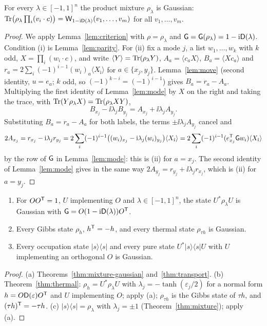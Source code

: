 \begin{theorem}\label{thm:mixture-gaussian}
For every $\lambda\in[-1,1]^n$ the product mixture $\rho_\lambda$ is Gaussian:
$\operatorname{Tr}\bigl(\rho_\lambda\prod_i(v_i\cdot c)\bigr)=\mathsf W_{1-\mathrm i\mathsf D(\lambda)}(v_1,\ldots,v_m)$ for all
$v_1,\ldots,v_m$.
\end{theorem}
\begin{proof}
We apply Lemma~\ref{lem:criterion} with $\rho=\rho_\lambda$ and $\mathsf G=\mathsf G(\rho_\lambda)=1-\mathrm i\mathsf D(\lambda)$.
Condition (i) is Lemma~\ref{lem:parity}. For (ii) fix a mode $j$, a list $w_1,\ldots,w_k$ with
$k$ odd, $X=\prod_i(w_i\cdot c)$, and write $\langle Y\rangle=\operatorname{Tr}(\rho_\lambda Y)$,
$A_a=\langle c_aX\rangle$, $B_a=\langle Xc_a\rangle$ and
$r_a=2\sum_i(-1)^{i-1}(w_i)_a\langle X_{\hat\imath}\rangle$ for $a\in\{x_j,y_j\}$.
Lemma~\ref{lem:move} (second identity, $u=e_a$; $k$ odd, so $(-1)^{k-i}=(-1)^{i-1}$) gives
$B_a=r_a-A_a$. Multiplying the first identity of Lemma~\ref{lem:mode} by $X$ on the right and
taking the trace, with $\operatorname{Tr}(Y\rho_\lambda X)=\operatorname{Tr}(\rho_\lambda XY)$,
\[
 B_{x_j}-\ii\lambda_jB_{y_j}=A_{x_j}+\ii\lambda_jA_{y_j}.
\]
Substituting $B_a=r_a-A_a$ for both labels, the terms $\pm\ii\lambda_jA_{y_j}$ cancel and
\[
 2A_{x_j}=r_{x_j}-\mathrm i\lambda_jr_{y_j}
 =2\sum_i(-1)^{i-1}\bigl((w_i)_{x_j}-\mathrm i\lambda_j(w_i)_{y_j}\bigr)\langle X_{\hat\imath}\rangle
 =2\sum_i(-1)^{i-1}(e_{x_j}^{\mathsf T}\mathsf G w_i)\langle X_{\hat\imath}\rangle
\]
by the row of $\mathsf G$ in Lemma~\ref{lem:mode}: this is (ii) for $a=x_j$. The second identity of
Lemma~\ref{lem:mode} gives in the same way $2A_{y_j}=r_{y_j}+\ii\lambda_jr_{x_j}$, which is (ii)
for $a=y_j$.
\end{proof}

\begin{corollary}\label{cor:families}
\begin{enumerate}
\item[(a)] For $OO^{\mathsf T}=1$, $U$ implementing $O$ and $\lambda\in[-1,1]^n$, the state
$U^*\rho_\lambda U$  is Gaussian with
$\mathsf G=O(1-\mathrm i\mathsf D(\lambda))O^{\mathsf T}$.
\item[(b)] Every Gibbs state $\rho_h$, $h^{\mathsf T}=-h$, and every thermal state
$\rho_{\tau h}$ is Gaussian.
\item[(c)] Every occupation state $|s\rangle\langle s|$ and every pure state
$U^*|s\rangle\langle s|U$ with $U$ implementing an orthogonal $O$ is Gaussian.
\end{enumerate}
\end{corollary}
\begin{proof}
(a) Theorems~\ref{thm:mixture-gaussian} and~\ref{thm:transport}. (b) Theorem~\ref{thm:thermal}:
$\rho_h=U^*\rho_\lambda U$ with $\lambda_j=-\tanh(\varepsilon_j/2)$ for a normal form
$h=O\mathsf D(\varepsilon)O^{\mathsf T}$ and $U$ implementing $O$; apply (a); $\rho_{\tau h}$ is the Gibbs
state of $\tau h$, and $(\tau h)^{\mathsf T}=-\tau h$. (c) $|s\rangle\langle s|=\rho_\lambda$ with $\lambda_j=\pm1$
(Theorem~\ref{thm:mixture}); apply (a).
\end{proof}

